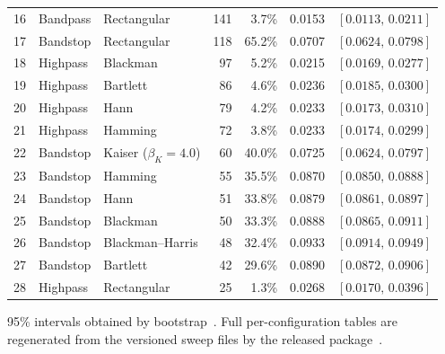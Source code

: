 \documentclass[journal]{IEEEtran}
\begin{document}
\begin{table}[!t]
\begin{tabular}{rllrrrc}
16 & Bandpass  & Rectangular               & 141 & 3.7\% & 0.0153 & $[0.0113,\,0.0211]$ \\
17 & Bandstop  & Rectangular               & 118 & 65.2\% & 0.0707 & $[0.0624,\,0.0798]$ \\
18 & Highpass  & Blackman                  &  97 & 5.2\% & 0.0215 & $[0.0169,\,0.0277]$ \\
19 & Highpass  & Bartlett                  &  86 & 4.6\% & 0.0236 & $[0.0185,\,0.0300]$ \\
20 & Highpass  & Hann                      &  79 & 4.2\% & 0.0233 & $[0.0173,\,0.0310]$ \\
21 & Highpass  & Hamming                   &  72 & 3.8\% & 0.0233 & $[0.0174,\,0.0299]$ \\
22 & Bandstop  & Kaiser ($\beta_K{=}4.0$)  &  60 & 40.0\% & 0.0725 & $[0.0624,\,0.0797]$ \\
23 & Bandstop  & Hamming                   &  55 & 35.5\% & 0.0870 & $[0.0850,\,0.0888]$ \\
24 & Bandstop  & Hann                      &  51 & 33.8\% & 0.0879 & $[0.0861,\,0.0897]$ \\
25 & Bandstop  & Blackman                  &  50 & 33.3\% & 0.0888 & $[0.0865,\,0.0911]$ \\
26 & Bandstop  & Blackman--Harris          &  48 & 32.4\% & 0.0933 & $[0.0914,\,0.0949]$ \\
27 & Bandstop  & Bartlett                  &  42 & 29.6\% & 0.0890 & $[0.0872,\,0.0906]$ \\
28 & Highpass  & Rectangular               &  25 & 1.3\% & 0.0268 & $[0.0170,\,0.0396]$ \\
\bottomrule
\end{tabular}

\vspace{2pt}
{\footnotesize 95\% intervals obtained by bootstrap~\cite{EfronTibshirani1993}.
Full per-configuration tables are regenerated from the versioned sweep files
by the released package~\cite{chaoticPFC2026}.}
\end{table}
\end{document}
